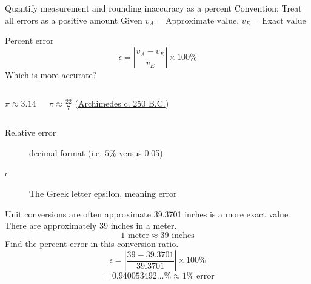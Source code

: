 \begin{frame}{Quantify measurement and rounding inaccuracy as a percent}
    {Convention: Treat all errors as a positive amount}
    Given $v_A= \text{Approximate value}$, $v_E= \text{Exact value}$ \par \bigskip
    Percent error
    $$\epsilon = \left|\frac{v_A-v_E}{v_E}\right| \times 100\%$$
    \bigskip    
    Which is more accurate? %
        \begin{columns}
                $\pi \approx 3.14$ \par \bigskip
                $\pi \approx \frac{22}{7}$ (\href{https://en.wikipedia.org/wiki/Archimedes}{Archimedes c. 250 B.C.}) \par \medskip
        \end{columns}  \vspace{0.5cm}
        \begin{description}
            \item[Relative error] decimal format (i.e. $5\%$ versus 0.05)
            \item[$\epsilon$] The Greek letter epsilon, meaning error
        \end{description}
    \end{frame}
    
\begin{frame}{Unit conversions are often approximate}
    {39.3701 inches is a more exact value}
    There are approximately 39 inches in a meter.
    $$ 1 \text{ meter} \approx 39 \text{ inches}$$
    Find the percent error in this conversion ratio. \vspace{1cm}
    $$\epsilon = \left|\frac{39-39.3701}{39.3701}\right| \times 100\%$$
    $$=0.940053492...\% \approx 1\% \text{ error}$$
    \end{frame}


